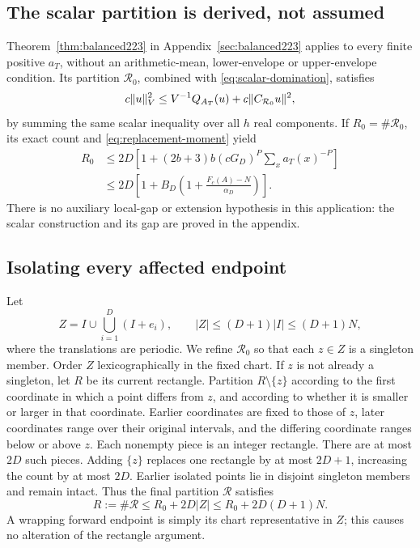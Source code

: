 \subsection{The scalar partition is derived, not assumed}
Theorem~\ref{thm:balanced223} in Appendix~\ref{sec:balanced223} applies to
every finite positive $a_T$, without an arithmetic-mean, lower-envelope or
upper-envelope condition. Its partition $\mathcal R_0$, combined with
\eqref{eq:scalar-domination}, satisfies
\begin{equation}\label{eq:positive-observation}
 c\|u\|_{V}^2\le V^{-1}Q_{A_T}(u)+c\|C_{\mathcal R_0}u\|^2,
\end{equation}
by summing the same scalar inequality over all $h$ real components.
If $R_0=\#\mathcal R_0$, its exact count and
\eqref{eq:replacement-moment} yield
\begin{align}\label{eq:initial-count}
 R_0&\le2D\left[1+(2b+3)b(cG_D)^P\sum_xa_T(x)^{-P}\right]\nonumber\\
 &\le2D\left[1+B_D\left(1+\frac{F_c(A)-N}{\alpha_D}\right)\right].
\end{align}
There is no auxiliary local-gap or extension hypothesis in this application:
the scalar construction and its gap are proved in the appendix.

\subsection{Isolating every affected endpoint}
Let
\begin{equation}\label{eq:endpoints}
 Z=I\cup\bigcup_{i=1}^D(I+e_i),\qquad |Z|\le(D+1)|I|\le(D+1)N,
\end{equation}
where the translations are periodic. We refine $\mathcal R_0$ so that each
$z\in Z$ is a singleton member. Order $Z$ lexicographically in the fixed
chart. If $z$ is not already a singleton, let $R$ be its current rectangle.
Partition $R\setminus\{z\}$ according to the first coordinate in which a
point differs from $z$, and according to whether it is smaller or larger in
that coordinate. Earlier coordinates are fixed to those of $z$, later
coordinates range over their original intervals, and the differing coordinate
ranges below or above $z$. Each nonempty piece is an integer rectangle.
There are at most $2D$ such pieces. Adding $\{z\}$ replaces one rectangle
by at most $2D+1$, increasing the count by at most $2D$.
Earlier isolated points lie in disjoint singleton members and remain intact.
Thus the final partition $\mathcal R$ satisfies
\begin{equation}\label{eq:refined-count}
 R:=\#\mathcal R\le R_0+2D|Z|\le R_0+2D(D+1)N.
\end{equation}
A wrapping forward endpoint is simply its chart representative in $Z$;
this causes no alteration of the rectangle argument.

